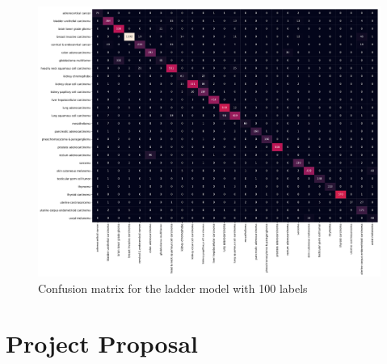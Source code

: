 \begin{figure}[H]
  \centering
  \includegraphics[scale=0.4, angle=90]{figs/ladder_tcga_standard_100.pdf}
  \caption{Confusion matrix for the ladder model with 100 labels}
\end{figure}

\chapter{Project Proposal} \label{proposal}
